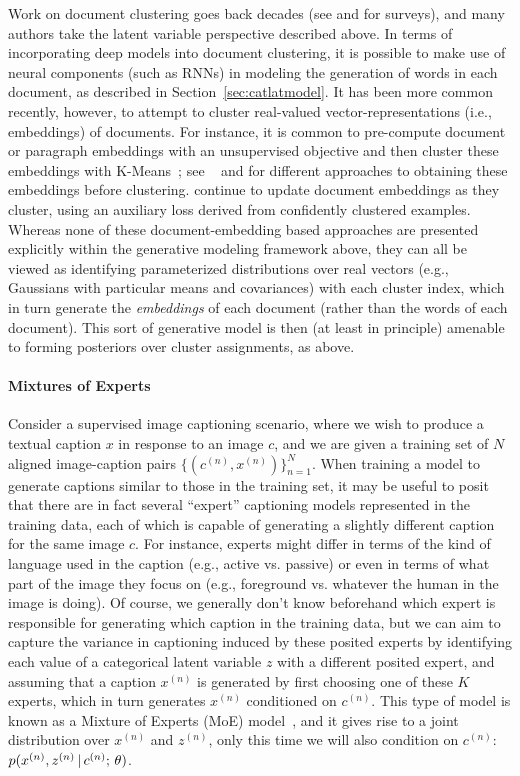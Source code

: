 \documentclass{article}
\begin{document}
Work on document clustering goes back decades (see \citet{willett1988recent} and \citet{aggarwal2012survey} for surveys), and many authors take the latent variable perspective described above. In terms of incorporating deep models into document clustering, it is possible to make use of neural components (such as RNNs) in modeling the generation of words in each document, as described in Section~\ref{sec:catlatmodel}. It has been more common recently, however, to attempt to cluster real-valued vector-representations (i.e., embeddings) of documents. For instance, it is common to pre-compute document or paragraph embeddings with an unsupervised objective and then cluster these embeddings with K-Means~\citep{macqueen1967some}; see ~\citet{le2014distributed} and \citet{xu2015short} for different approaches to obtaining these embeddings before clustering. \citet{xie2016unsupervised} continue to update document embeddings as they cluster, using an auxiliary loss derived from confidently clustered examples.  Whereas none of these document-embedding based approaches are presented explicitly within the generative modeling framework above, they can all be viewed as identifying parameterized distributions over real vectors (e.g., Gaussians with particular means and covariances) with each cluster index, which in turn generate the \textit{embeddings} of each document (rather than the words of each document). This sort of generative model is then (at least in principle) amenable to forming posteriors over cluster assignments, as above.

\paragraph{Mixtures of Experts}
Consider a supervised image captioning scenario, where we wish to produce a textual caption $x$ in response to an image $c$, and we are given a training set of $N$ aligned image-caption pairs $\{(c^{(n)}, x^{(n)})\}_{n=1}^N$. When training a model to generate captions similar to those in the training set, it may be useful to posit that there are in fact several ``expert'' captioning models represented in the training data, each of which is capable of generating a slightly different caption for the same image $c$. For instance, experts might differ in terms of the kind of language used in the caption (e.g., active vs. passive) or even in terms of what part of the image they focus on (e.g., foreground vs. whatever the human in the image is doing). Of course, we generally don't know beforehand which expert is responsible for generating which caption in the training data, but we can aim to capture the variance in captioning induced by these posited experts by identifying each value of a categorical latent variable $z$ with a different posited expert, and assuming that a caption $x^{(n)}$ is generated by first choosing one of these $K$ experts, which in turn generates $x^{(n)}$ conditioned on $c^{(n)}$. This type of model is known as a Mixture of Experts (MoE) model~\citep{jacobs1991adaptive}, and it gives rise to a joint distribution over $x^{(n)}$ and $z^{(n)}$, only this time we will also condition on $c^{(n)}$: $p(x^{(n)}, z^{(n)} \,|\, c^{(n)} ; \, \theta)$. 
\end{document}

